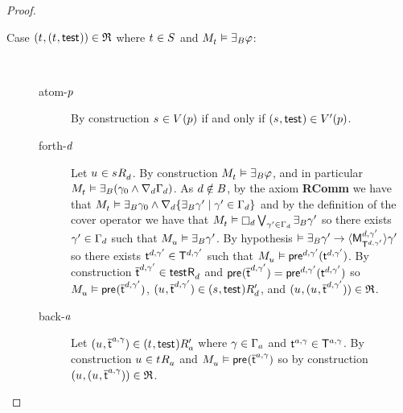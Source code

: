\begin{proof}
\begin{description}
    \item[{Case $(\kStateT, (\kStateT, \aStateTest)) \in \refinement$ where $\kStateT \in \kStates$ and $\kPModel{\kStateT} \entails \someactsBs \phi$:}] \hfill\\
        \begin{description}
            \item[atom-$\atomP$]
                By construction $\kStateS \in \kValuation(\atomP)$ if and only if $(\kStateS, \aStateTest) \in \kValuationP(\atomP)$.
            \item[forth-$\agentD$]
                Let $\kStateU \in \kSuccessorsD{\kStateS}$.
                By construction $\kPModel{\kStateT} \entails \someactsBs \phi$, and in particular $\kPModel{\kStateT} \entails \someactsBs (\gamma_0 \land \coversD \Gamma_\agentD)$.
                As $\agentD \notin \agentsB$, by the \axiomAamlS{} axiom {\bf RComm} we have that $\kPModel{\kStateT} \entails \someactsBs \gamma_0 \land \coversD \{\someactsBs \gamma' \mid \gamma' \in \Gamma_\agentD\}$ and by the definition of the cover operator we have that $\kPModel{\kStateT} \entails \necessaryD \bigvee_{\gamma' \in \Gamma_\agentD} \someactsBs \gamma'$ so there exists $\gamma' \in \Gamma_\agentD$ such that $\kPModel{\kStateU} \entails \someactsBs \gamma'$.
                By hypothesis $\entails \someactsBs \gamma' \implies \actionE{\aPModel[\agentD, \gamma']{\aStatesT[\agentD, \gamma']}} \gamma'$ so there exists $\aStateT[\agentD, \gamma'] \in \aStatesT[\agentD, \gamma']$ such that $\kPModel{\kStateU} \entails \aPrecondition[\agentD, \gamma'](\aStateT[\agentD, \gamma'])$.
                By construction $\aPStateT[\agentD, \gamma'] \in \aSuccessorsD{\aStateTest}$ and $\aPrecondition(\aPStateT[\agentD, \gamma']) = \aPrecondition[\agentD, \gamma'](\aStateT[\agentD, \gamma'])$ so $\kPModel{\kStateU} \entails \aPrecondition(\aPStateT[\agentD, \gamma'])$, $(\kStateU, \aPStateT[\agentD, \gamma']) \in \kSuccessorsPD{(\kStateS, \aStateTest)}$, and $(\kStateU, (\kStateU, \aPStateT[\agentD, \gamma'])) \in \refinement$.
            \item[back-$\agentA$]
                Let $(\kStateU, \aPStateT[\agentA, \gamma]) \in \kSuccessorsPA{(\kStateT, \aStateTest)}$ where $\gamma \in \Gamma_\agentA$ and $\aStateT[\agentA, \gamma] \in \aStatesT[\agentA, \gamma]$.
                By construction $\kStateU \in \kSuccessorsA{\kStateT}$ and $\kPModel{\kStateU} \entails \aPrecondition(\aPStateT[\agentA, \gamma])$ so by construction $(\kStateU, (\kStateU, \aPStateT[\agentA, \gamma])) \in \refinement$.

\end{description}
\end{description}
\end{proof}
